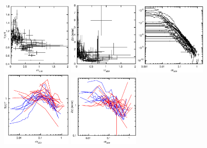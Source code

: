 \documentclass[structabstract]{aa}
\begin{document}
\begin{figure}[!ht]
 \centering
  \includegraphics[width=0.31\textwidth]{tprofiles500_points_lin.eps}\quad
  \includegraphics[width=0.31\textwidth]{Zprofiles500_points_lin.eps}\qquad
  \includegraphics[width=0.31\textwidth]{sbps500_points.eps}
  \includegraphics[width=0.31\textwidth]{tprofiles500_cc_c.eps}\quad
  \includegraphics[width=0.31\textwidth]{Zprofiles500_cc_c.eps}\qquad

\end{figure}
\end{document}
